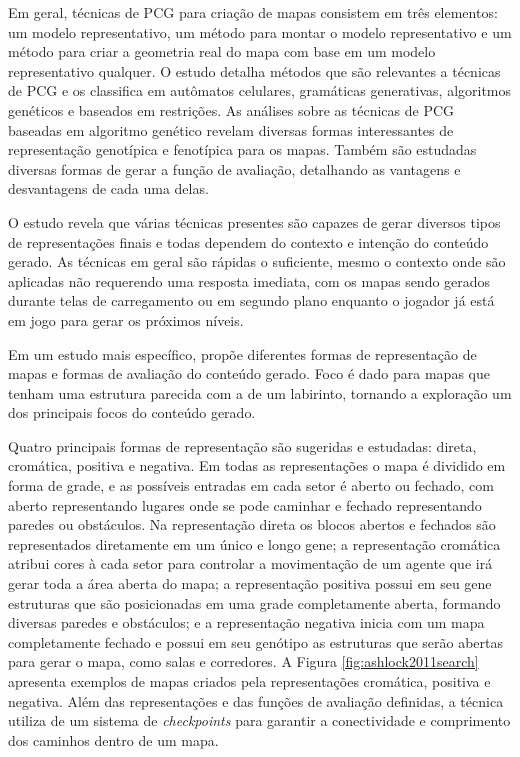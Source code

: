 Em geral, técnicas de PCG para criação de mapas consistem em três elementos: um modelo representativo, um método para montar o modelo representativo e um método para criar a geometria real do mapa com base em um modelo representativo qualquer. O estudo detalha métodos que são relevantes a técnicas de PCG e os classifica em autômatos celulares, gramáticas generativas, algoritmos genéticos e baseados em restrições. As análises sobre as técnicas de PCG baseadas em algoritmo genético revelam diversas formas interessantes de representação genotípica e fenotípica para os mapas. Também são estudadas diversas formas de gerar a função de avaliação, detalhando as vantagens e desvantagens de cada uma delas.

O estudo revela que várias técnicas presentes são capazes de gerar diversos tipos de representações finais e todas dependem do contexto e intenção do conteúdo gerado. As técnicas em geral são rápidas o suficiente, mesmo o contexto onde são aplicadas não requerendo uma resposta imediata, com os mapas sendo gerados durante telas de carregamento ou em segundo plano enquanto o jogador já está em jogo para gerar os próximos níveis.

Em um estudo mais específico, \cite{ashlock2011search} propõe diferentes formas de representação de mapas e formas de avaliação do conteúdo gerado. Foco é dado para mapas que tenham uma estrutura parecida com a de um labirinto, tornando a exploração um dos principais focos do conteúdo gerado.

Quatro principais formas de representação são sugeridas e estudadas: direta, cromática, positiva e negativa. Em todas as representações o mapa é dividido em forma de grade, e as possíveis entradas em cada setor é aberto ou fechado, com aberto representando lugares onde se pode caminhar e fechado representando paredes ou obstáculos. Na representação direta os blocos abertos e fechados são representados diretamente em um único e longo gene; a representação cromática atribui cores à cada setor para controlar a movimentação de um agente que irá gerar toda a área aberta do mapa; a representação positiva possui em seu gene estruturas que são posicionadas em uma grade completamente aberta, formando diversas paredes e obstáculos; e a representação negativa inicia com um mapa completamente fechado e possui em seu genótipo as estruturas que serão abertas para gerar o mapa, como salas e corredores. A Figura \ref{fig:ashlock2011search} apresenta exemplos de mapas criados pela representações cromática, positiva e negativa. Além das representações e das funções de avaliação definidas, a técnica utiliza de um sistema de \emph{checkpoints} para garantir a conectividade e comprimento dos caminhos dentro de um mapa.

